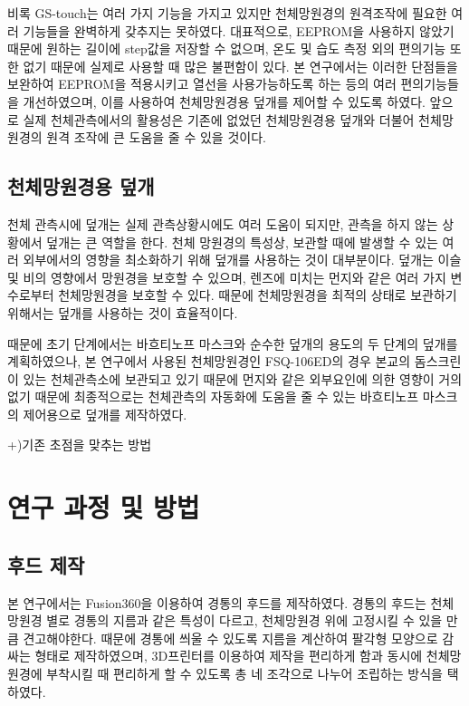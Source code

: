 비록 GS-touch는 여러 가지 기능을 가지고 있지만 천체망원경의 원격조작에 필요한 여러 기능들을 완벽하게 갖추지는 못하였다. 대표적으로, EEPROM을 사용하지 않았기 때문에 원하는 길이에 step값을 저장할 수 없으며, 온도 및 습도 측정 외의 편의기능 또한 없기 때문에 실제로 사용할 때 많은 불편함이 있다. 본 연구에서는 이러한 단점들을 보완하여 EEPROM을 적용시키고 열선을 사용가능하도록 하는 등의 여러 편의기능들을 개선하였으며, 이를 사용하여 천체망원경용 덮개를 제어할 수 있도록 하였다. 앞으로 실제 천체관측에서의 활용성은 기존에 없었던 천체망원경용 덮개와 더불어 천체망원경의 원격 조작에 큰 도움을 줄 수 있을 것이다.

\subsection{천체망원경용 덮개}

천체 관측시에 덮개는 실제 관측상황시에도 여러 도움이 되지만, 관측을 하지 않는 상황에서 덮개는 큰 역할을 한다. 천체 망원경의 특성상, 보관할 때에 발생할 수 있는 여러 외부에서의 영향을 최소화하기 위해 덮개를 사용하는 것이 대부분이다. 덮개는 이슬 및 비의 영향에서 망원경을 보호할 수 있으며, 렌즈에 미치는 먼지와 같은 여러 가지 변수로부터 천체망원경을 보호할 수 있다. 때문에 천체망원경을 최적의 상태로 보관하기 위해서는 덮개를 사용하는 것이 효율적이다. 

때문에 초기 단계에서는 바흐티노프 마스크와 순수한 덮개의 용도의 두 단계의 덮개를 계획하였으나, 본 연구에서 사용된 천체망원경인 FSQ-106ED의 경우 본교의 돔스크린이 있는 천체관측소에 보관되고 있기 때문에 먼지와 같은 외부요인에 의한 영향이 거의 없기 때문에 최종적으로는 천체관측의 자동화에 도움을 줄 수 있는 바흐티노프 마스크의 제어용으로 덮개를 제작하였다.

+)기존 초점을 맞추는 방법

\newpage
\section{연구 과정 및 방법}
\subsection{후드 제작}
본 연구에서는 Fusion360을 이용하여 경통의 후드를 제작하였다. 경통의 후드는 천체망원경 별로 경통의 지름과 같은 특성이 다르고, 천체망원경 위에 고정시킬 수 있을 만큼 견고해야한다. 때문에 경통에 씌울 수 있도록 지름을 계산하여 팔각형 모양으로 감싸는 형태로 제작하였으며, 3D프린터를 이용하여 제작을 편리하게 함과 동시에 천체망원경에 부착시킬 때 편리하게 할 수 있도록 총 네 조각으로 나누어 조립하는 방식을 택하였다.

